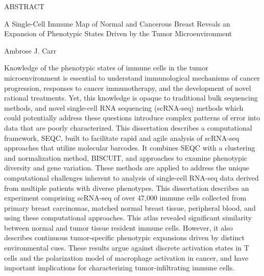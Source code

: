 
\pagestyle{empty} %
\begin{center}
  ABSTRACT

  A Single-Cell Immune Map of Normal and Cancerous Breast Reveals an Expansion of Phenotypic States Driven by the Tumor Microenvironment

  Ambrose J. Carr
\end{center}

Knowledge of the phenotypic states of immune cells in the tumor microenvironment is essential to understand immunological mechanisms of cancer progression, responses to cancer immunotherapy, and the development of novel rational treatments.
Yet, this knowledge is opaque to traditional bulk sequencing methods, and novel single-cell RNA sequencing (scRNA-seq) methods which could potentially address these questions introduce complex patterns of error into data that are poorly characterized. 
This dissertation describes a computational framework, SEQC, built to facilitate rapid and agile analysis of scRNA-seq approaches that utilize molecular barcodes.
It combines SEQC with a clustering and normalization method, BISCUIT, and approaches to examine phenotypic diversity and gene variation. 
These methods are applied to address the unique computational challenges inherent to analysis of single-cell RNA-seq data derived from multiple patients with diverse phenotypes. 
This dissertation describes an experiment comprising scRNA-seq of over 47,000 immune cells collected from primary breast carcinomas, matched normal breast tissue, peripheral blood, and using these computational approaches.  
This atlas revealed significant similarity between normal and tumor tissue resident immune cells.
However, it also describes continuous tumor-specific phenotypic expansions driven by distinct environmental cues.
These results argue against discrete activation states in T cells and the polarization model of macrophage activation in cancer, and have important implications for characterizing tumor-infiltrating immune cells.
